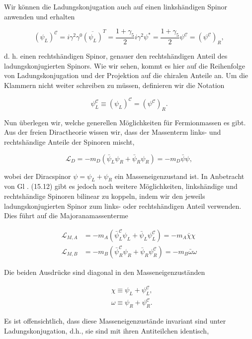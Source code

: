 \documentclass[10pt, letterpaper]{article}
\begin{document}
Wir können die Ladungskonjugation auch auf einen linkshändigen Spinor anwenden und erhalten

$$
\left(\psi_{L}\right)^{\mathcal{C}}=i \gamma^{2} \gamma^{0}{\overline{\left(\psi_{L}\right)}}^{T}=\frac{1+\gamma_{5}}{2} i \gamma^{2} \psi^{*}=\frac{1+\gamma_{5}}{2} \psi^{\mathcal{C}}=\left(\psi^{\mathcal{C}}\right)_{R},
$$

d. h. einen rechtshändigen Spinor, genauer den rechtshändigen Anteil des ladungskonjugierten Spinors. Wie wir sehen, kommt es hier auf die Reihenfolge von Ladungskonjugation und der Projektion auf die chiralen Anteile an. Um die Klammern nicht weiter schreiben zu müssen, definieren wir die Notation

$$
\psi_{L}^{\mathcal{C}} \equiv\left(\psi_{L}\right)^{\mathcal{C}}=\left(\psi^{\mathcal{C}}\right)_{R} .
$$

Nun überlegen wir, welche generellen Möglichkeiten für Fermionmassen es gibt. Aus der freien Diractheorie wissen wir, dass der Massenterm links- und rechtshändige Anteile der Spinoren mischt,

$$
\mathscr{L}_{D}=-m_{D}\left(\bar{\psi}_{L} \psi_{R}+\bar{\psi}_{R} \psi_{R}\right)=-m_{D} \bar{\psi} \psi,
$$

wobei der Diracspinor $\psi=\psi_{L}+\psi_{R}$ ein Masseneigenzustand ist. In Anbetracht von Gl . (15.12) gibt es jedoch noch weitere Möglichkeiten, linkshändige und rechtshändige Spinoren bilinear zu koppeln, indem wir den jeweils ladungskonjugierten Spinor zum links- oder rechtshändigen Anteil verwenden. Dies führt auf die Majoranamassenterme

$$
\begin{aligned}
\mathscr{L}_{M, A} & =-m_{A}\left(\bar{\psi}_{L}^{\mathcal{C}} \psi_{L}+\bar{\psi}_{L} \psi_{L}^{\mathcal{C}}\right)=-m_{A} \bar{\chi} \chi \\
\mathscr{L}_{M, B} & =-m_{B}\left(\bar{\psi}_{R}^{\mathcal{C}} \psi_{R}+\bar{\psi}_{R} \psi_{R}^{\mathcal{C}}\right)=-m_{B} \bar{\omega} \omega
\end{aligned}
$$

Die beiden Ausdrücke sind diagonal in den Masseneigenzuständen

$$
\begin{aligned}
& \chi \equiv \psi_{L}+\psi_{L}^{\mathcal{C}}, \\
& \omega \equiv \psi_{R}+\psi_{R}^{\mathcal{C}} .
\end{aligned}
$$

Es ist offensichtlich, dass diese Masseneigenzustände invariant sind unter Ladungskonjugation, d.h., sie sind mit ihren Antiteilchen identisch,
\end{document}
